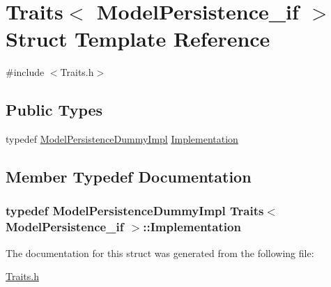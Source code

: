\hypertarget{struct_traits_3_01_model_persistence__if_01_4}{}\section{Traits$<$ Model\+Persistence\+\_\+if $>$ Struct Template Reference}
\label{struct_traits_3_01_model_persistence__if_01_4}


{\ttfamily \#include $<$Traits.\+h$>$}

\subsection*{Public Types}
\begin{DoxyCompactItemize}
\item 
typedef \hyperlink{class_model_persistence_dummy_impl}{Model\+Persistence\+Dummy\+Impl} \hyperlink{struct_traits_3_01_model_persistence__if_01_4_aa8110b6edf6b24ecaa22162349d97730}{Implementation}
\end{DoxyCompactItemize}


\subsection{Member Typedef Documentation}
\subsubsection[{\texorpdfstring{Implementation}{Implementation}}]{\setlength{\rightskip}{0pt plus 5cm}typedef {\bf Model\+Persistence\+Dummy\+Impl} {\bf Traits}$<$ {\bf Model\+Persistence\+\_\+if} $>$\+::{\bf Implementation}}\hypertarget{struct_traits_3_01_model_persistence__if_01_4_aa8110b6edf6b24ecaa22162349d97730}{}\label{struct_traits_3_01_model_persistence__if_01_4_aa8110b6edf6b24ecaa22162349d97730}


The documentation for this struct was generated from the following file\+:\begin{DoxyCompactItemize}
\item 
\hyperlink{_traits_8h}{Traits.\+h}\end{DoxyCompactItemize}
